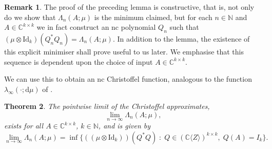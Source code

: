\documentclass[11pt,reqno]{amsart}
\def\l{\lambda}
\def\L{\Lambda}
\def\rmd{\mathrm{d}}
\def\NN{\mathbb{N}}
\def\CC{\mathbb{C}}
\newtheorem{theorem}{Theorem}[section]
\theoremstyle{definition}
\newtheorem{remark}[theorem]{Remark}
\numberwithin{equation}{section}
\begin{document}
\begin{remark}
    \label{rem:Minimiser}
    The proof of the preceding lemma is constructive, that is, not only do we show that \(\L_n(A; \mu)\) is the minimum claimed, but for each \(n \in \NN\) and \(A \in \CC^{k\times k}\) we in fact construct an nc polynomial \(Q_n\) such that \((\mu \otimes \mathrm{Id}_k)(Q_n^* Q_n) = \L_n(A;\mu)\). In addition to the lemma, the existence of this explicit minimiser shall prove useful to us later. We emphasise that this sequence is dependent upon the choice of input \(A \in \CC^{k\times k}\).
\end{remark}

We can use this to obtain an nc Christoffel function, analogous to the function \(\l_{\infty}(\cdot ; \rmd \mu)\) of \cite{Sim05}.

\begin{theorem}
    \label{thm:CFExists}
    The pointwise limit of the Christoffel approximates,
    \[
        \lim_{n\to\infty} \L_{n}(A; \mu),
    \]
    exists for all \(A \in \CC^{k\times k}\), \(k \in \NN\), and is given by
    \[
        \lim_{n\to\infty} \L_{n}(A; \mu) = \inf\{((\mu \otimes \mathrm{Id}_k))(Q^*Q) \; : \; Q \in (\CC\langle Z \rangle)^{k\times k}, \; Q(A) = I_k\}.
    \]
\end{theorem}
\end{document}
